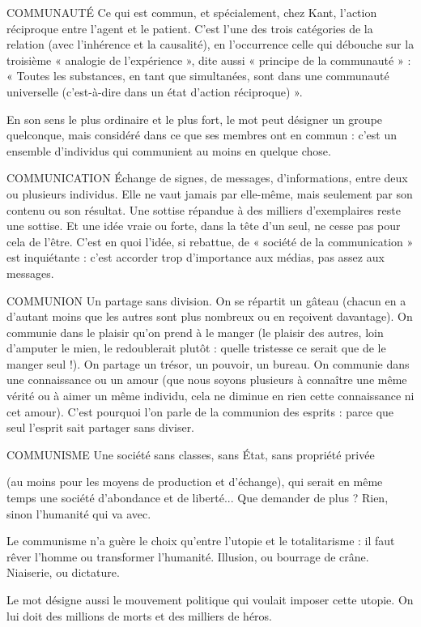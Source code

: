 COMMUNAUTÉ Ce qui est commun, et spécialement, chez Kant, l’action
réciproque entre l’agent et le patient. C’est l’une des trois
catégories de la relation (avec l’inhérence et la causalité), en l’occurrence celle
qui débouche sur la troisième « analogie de l’expérience », dite aussi « principe
de la communauté » : « Toutes les substances, en tant que simultanées, sont
dans une communauté universelle (c’est-à-dire dans un état d’action réciproque) ».

En son sens le plus ordinaire et le plus fort, le mot peut désigner un groupe
quelconque, mais considéré dans ce que ses membres ont en commun : c’est un
ensemble d’individus qui communient au moins en quelque chose.

COMMUNICATION Échange de signes, de messages, d'informations, entre
deux ou plusieurs individus. Elle ne vaut jamais par
elle-même, mais seulement par son contenu ou son résultat. Une sottise
répandue à des milliers d'exemplaires reste une sottise. Et une idée vraie ou
forte, dans la tête d’un seul, ne cesse pas pour cela de l’être. C’est en quoi l’idée,
si rebattue, de « société de la communication » est inquiétante : c’est accorder
trop d’importance aux médias, pas assez aux messages.

COMMUNION Un partage sans division. On se répartit un gâteau (chacun
en a d’autant moins que les autres sont plus nombreux ou
en reçoivent davantage). On communie dans le plaisir qu’on prend à le
manger (le plaisir des autres, loin d’amputer le mien, le redoublerait plutôt :
quelle tristesse ce serait que de le manger seul !). On partage un trésor, un
pouvoir, un bureau. On communie dans une connaissance ou un amour (que
nous soyons plusieurs à connaître une même vérité ou à aimer un même individu,
cela ne diminue en rien cette connaissance ni cet amour). C’est pourquoi
l’on parle de la communion des esprits : parce que seul l'esprit sait
partager sans diviser.

COMMUNISME Une société sans classes, sans État, sans propriété privée

(au moins pour les moyens de production et d'échange),
qui serait en même temps une société d’abondance et de liberté... Que
demander de plus ? Rien, sinon l’humanité qui va avec.

Le communisme n’a guère le choix qu’entre l’utopie et le totalitarisme : il
faut rêver l’homme ou transformer l'humanité. Illusion, ou bourrage de crâne.
Niaiserie, ou dictature.

Le mot désigne aussi le mouvement politique qui voulait imposer cette
utopie. On lui doit des millions de morts et des milliers de héros.

